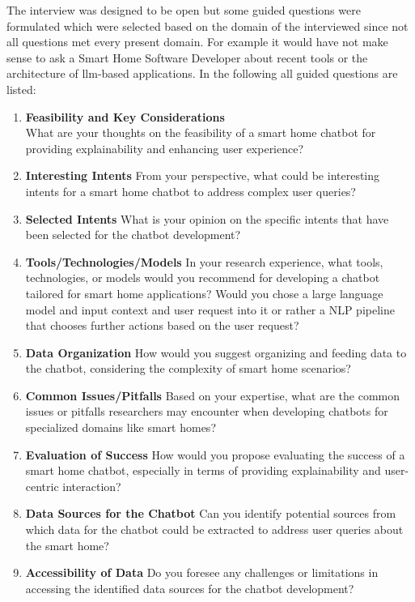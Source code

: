 The interview was designed to be open but some guided questions were formulated which were selected based on the domain of the interviewed since not all questions met every present domain.
For example it would have not make sense to ask a Smart Home Software Developer about recent tools or the architecture of \gls{llm}-based applications.
In the following all guided questions are listed:

\begin{enumerate}
    \item \textbf{Feasibility and Key Considerations} \\
    What are your thoughts on the feasibility of a smart home chatbot for providing explainability and enhancing user experience?
    \item \textbf{Interesting Intents}
    From your perspective, what could be interesting intents for a smart home chatbot to address complex user queries?    
    \item \textbf{Selected Intents}
    What is your opinion on the specific intents that have been selected for the chatbot development?    
    \item \textbf{Tools/Technologies/Models}
    In your research experience, what tools, technologies, or models would you recommend for developing a chatbot tailored for smart home applications?
    Would you chose a large language model and input context and user request into it or rather a NLP pipeline that chooses further actions based on the user request?   
    \item \textbf{Data Organization}
    How would you suggest organizing and feeding data to the chatbot, considering the complexity of smart home scenarios?    
    \item \textbf{Common Issues/Pitfalls}
    Based on your expertise, what are the common issues or pitfalls researchers may encounter when developing chatbots for specialized domains like smart homes?
    \item \textbf{Evaluation of Success}
    How would you propose evaluating the success of a smart home chatbot, especially in terms of providing explainability and user-centric interaction? 
    \item \textbf{Data Sources for the Chatbot}
    Can you identify potential sources from which data for the chatbot could be extracted to address user queries about the smart home?
    \item \textbf{Accessibility of Data}
    Do you foresee any challenges or limitations in accessing the identified data sources for the chatbot development?
           
\end{enumerate}

